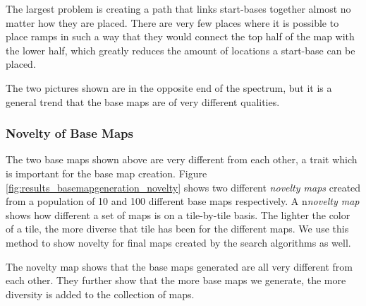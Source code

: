 The largest problem is creating a path that links start-bases together almost no matter how they are placed. There are very few places where it is possible to place ramps in such a way that they would connect the top half of the map with the lower half, which greatly reduces the amount of locations a start-base can be placed.

The two pictures shown are in the opposite end of the spectrum, but it is a general trend that the base maps are of very different qualities. 

\subsubsection{Novelty of Base Maps}

The two base maps shown above are very different from each other, a trait which is important for the base map creation. Figure \ref{fig:results_basemapgeneration_novelty} shows two different \textit{novelty maps} created from a population of 10 and 100 different base maps respectively. A n\textit{novelty map} shows how different a set of maps is on a tile-by-tile basis. The lighter the color of a tile, the more diverse that tile has been for the different maps. We use this method to show novelty for final maps created by the search algorithms as well.


The novelty map shows that the base maps generated are all very different from each other. They further show that the more base maps we generate, the more diversity is added to the collection of maps.